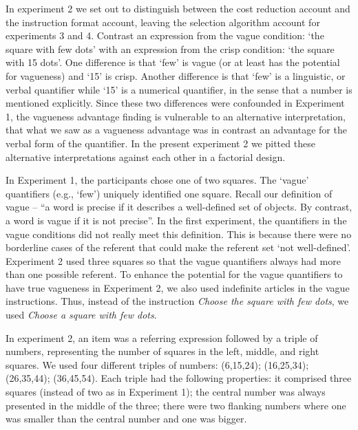 \documentclass[graybox,envcountchap,sectrefs%
,footinfo
]{svmono}
\begin{document}
In experiment 2 we set out to distinguish between the cost reduction account and the instruction format account, leaving the selection algorithm account for experiments 3 and 4. Contrast an expression from the vague condition: `the square with few dots' with an expression from the crisp condition: `the square with 15 dots'. One difference is that `few' is vague (or at least has the potential for vagueness) and `15' is crisp. Another difference is that `few' is a linguistic, or verbal quantifier while `15' is a numerical quantifier, in the sense that a number is mentioned explicitly. Since these two differences were confounded in Experiment 1, the vagueness advantage finding is vulnerable to an alternative interpretation, that what we saw as a vagueness advantage was in contrast an advantage for the verbal form of the quantifier. In the present experiment 2 we pitted these alternative interpretations against each other in a factorial design. 

In Experiment 1, the participants chose one of two squares. The `vague' quantifiers (e.g., `few') uniquely identified one square. Recall our definition of vague  -- ``a word is precise if it describes a well-defined set of objects. By contrast, a word is vague if it is not precise''.  In the first experiment, the quantifiers in the vague conditions did not really meet this definition. This is because there were no borderline cases of the referent that could make the referent set `not well-defined'. Experiment 2 used three squares so that the vague quantifiers always had more than one possible referent. To enhance the potential for the vague quantifiers to have true vagueness in Experiment 2, we also used indefinite articles in the vague instructions. Thus, instead of the instruction \emph{Choose the square with few dots}, we used \emph{Choose a square with few dots}.

In experiment 2, an item was a referring expression followed by a triple of numbers, representing the number of squares in the left, middle, and right squares. We used four different triples of numbers: (6,15,24); (16,25,34); (26,35,44); (36,45,54). Each triple had the following properties: it comprised three squares (instead of two as in Experiment 1); the central number was always presented in the middle of the three; there were two flanking numbers where one was smaller than the central number and one was bigger. 
\end{document}
